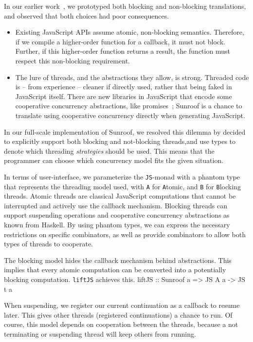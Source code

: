 \documentclass{llncs}
\newcommand{\Src}[1]{{\tt{#1}}}
\newcommand{\JS}{\Src{JS}}
\newenvironment{Code}{\verbatim}{\endverbatim}
\begin{document}
In our earlier work~\cite{...}, we prototyped both blocking and non-blocking
translations, and observed that both choices had poor consequences.
\begin{itemize}
\item Existing JavaScript APIs assume atomic, non-blocking
semantics. Therefore, if we compile a higher-order function
for a callback, it must not block. 
Further, if this higher-order function returns a result, 
the function must respect this non-blocking requirement.
\item The lure of threads, and the abstractions they allow, 
is strong. Threaded code is -- from experience -- cleaner if 
directly used, rather that being faked in JavaScript itself.
There are new libraries in JavaScript that encode
some cooperative concurrency abstractions, like promises~\cite{...};
Sunroof is a chance to translate using cooperative concurrency 
directly when generating JavaScript.
\end{itemize}
In our full-scale implementation of Sunroof,
we resolved this dilemma by
decided to explicitly support both blocking
and not-blocking threads,and use types to denote which
threading {\em strategies\/} should be used.
This means that the programmer can choose which concurrency model fits
the given situation.

In terms of user-interface, we parameterize the \JS-monad
with a phantom type that represents the threading model used, 
with \Src{A} for \Src{A}tomic,
and \Src{B} for \Src{B}locking threads. 
Atomic threads are classical JavaScript computations that
cannot be interrupted and actively use the callback
mechanism. Blocking threads can
support suspending operations and cooperative concurrency
abstractions as known from Haskell. By using phantom
types, we can express the necessary
restrictions on specific combinators, as well
as provide combinators to allow both types of
threads to cooperate.

The blocking model hides the callback mechanism behind abstractions.
This implies that every atomic computation can be converted into 
a potentially blocking computation. \Src{liftJS} achieves this.
\begin{Code}
liftJS :: Sunroof a => JS A a -> JS t a
\end{Code}

When suspending, we register our current
continuation as a callback to resume later. This gives other 
threads (registered continuations) a chance to run.
Of course, this model depends on cooperation between the threads,
because a not terminating or suspending thread will keep others from running.
\end{document}
